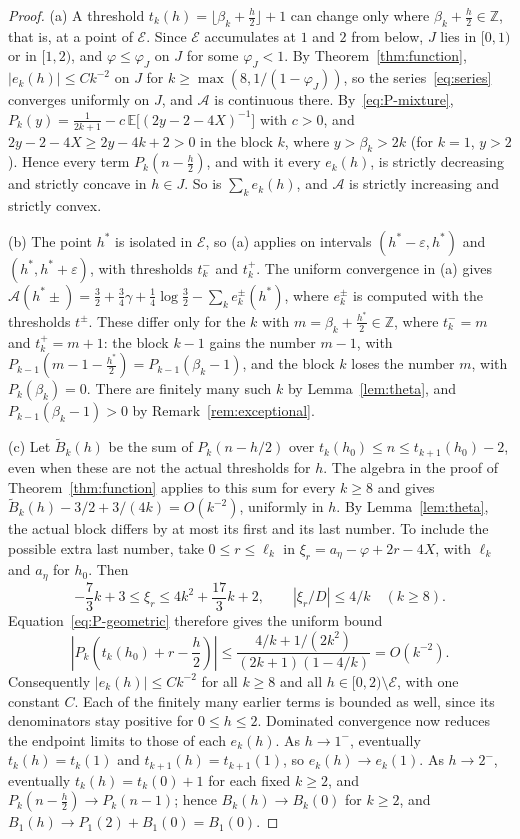\documentclass[11pt]{article}
\theoremstyle{definition}
\theoremstyle{remark}
\newcommand{\E}{\mathbb{E}}
\newcommand{\Alp}{\mathcal{A}}
\begin{document}
\begin{proof}
(a) A threshold $t_k(h)=\lfloor\beta_k+\frac h2\rfloor+1$ can change only
where $\beta_k+\frac h2\in\mathbb Z$, that is, at a point of
$\mathcal E$. Since $\mathcal E$ accumulates at $1$ and $2$ from below,
$J$ lies in $[0,1)$ or in $[1,2)$, and $\varphi\le\varphi_J$ on $J$ for
some $\varphi_J<1$. By Theorem~\ref{thm:function},
$|e_k(h)|\le Ck^{-2}$ on $J$ for $k\ge\max(8,1/(1-\varphi_J))$, so the
series~\eqref{eq:series} converges uniformly on $J$, and $\Alp$ is
continuous there. By~\eqref{eq:P-mixture},
$P_k(y)=\frac1{2k+1}-c\,\E\bigl[(2y-2-4X)^{-1}\bigr]$ with $c>0$, and
$2y-2-4X\ge2y-4k+2>0$ in the block $k$, where $y>\beta_k>2k$ (for $k=1$,
$y>2$). Hence every term $P_k(n-\frac h2)$, and with it every $e_k(h)$,
is strictly decreasing and strictly concave in $h\in J$. So is
$\sum_ke_k(h)$, and $\Alp$ is strictly increasing and strictly convex.

(b) The point $h^*$ is isolated in $\mathcal E$, so (a) applies on
intervals $(h^*-\varepsilon,h^*)$ and $(h^*,h^*+\varepsilon)$, with
thresholds $t_k^-$ and $t_k^+$. The uniform convergence in (a) gives
$\Alp(h^*\pm)=\frac32+\frac34\gamma+\frac14\log\frac32-\sum_ke_k^\pm(h^*)$,
where $e_k^\pm$ is computed with the thresholds $t^\pm$. These differ
only for the $k$ with $m=\beta_k+\frac{h^*}2\in\mathbb Z$, where
$t_k^-=m$ and $t_k^+=m+1$: the block $k-1$ gains the number $m-1$, with
$P_{k-1}(m-1-\frac{h^*}2)=P_{k-1}(\beta_k-1)$, and the block $k$ loses
the number $m$, with $P_k(\beta_k)=0$. There are finitely many such $k$
by Lemma~\ref{lem:theta}, and $P_{k-1}(\beta_k-1)>0$ by
Remark~\ref{rem:exceptional}.

(c) Let $\widetilde B_k(h)$ be the sum of $P_k(n-h/2)$ over
$t_k(h_0)\le n\le t_{k+1}(h_0)-2$, even when these are not the actual
thresholds for $h$. The algebra in the proof of
Theorem~\ref{thm:function} applies to this sum for every $k\ge8$ and
gives $\widetilde B_k(h)-3/2+3/(4k)=O(k^{-2})$, uniformly in $h$.
By Lemma~\ref{lem:theta}, the actual block differs by at most its first
and its last number. To include the possible extra last number, take
$0\le r\le\ell_k$ in $\xi_r=a_\eta-\varphi+2r-4X$, with $\ell_k$
and $a_\eta$ for $h_0$. Then
\[
-\frac73k+3\le\xi_r\le4k^2+\frac{17}3k+2,
\qquad |\xi_r/D|\le4/k\quad(k\ge8).
\]
Equation~\eqref{eq:P-geometric} therefore gives the uniform bound
\[
\left|P_k\left(t_k(h_0)+r-\frac h2\right)\right|
\le\frac{4/k+1/(2k^2)}{(2k+1)(1-4/k)}=O(k^{-2}).
\]
Consequently $|e_k(h)|\le Ck^{-2}$ for all $k\ge8$ and all
$h\in[0,2)\setminus\mathcal E$, with one constant $C$. Each of the
finitely many earlier terms is bounded as well, since its denominators
stay positive for $0\le h\le2$. Dominated convergence now reduces
the endpoint limits to those of each $e_k(h)$.
As $h\to1^-$, eventually $t_k(h)=t_k(1)$ and
$t_{k+1}(h)=t_{k+1}(1)$, so $e_k(h)\to e_k(1)$. As $h\to2^-$, eventually
$t_k(h)=t_k(0)+1$ for each fixed $k\ge2$, and
$P_k(n-\frac h2)\to P_k(n-1)$; hence $B_k(h)\to B_k(0)$ for $k\ge2$, and
$B_1(h)\to P_1(2)+B_1(0)=B_1(0)$.
\end{proof}
\end{document}
